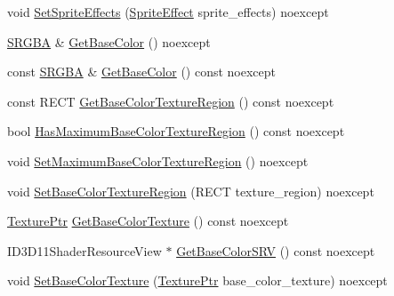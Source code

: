 \begin{DoxyCompactItemize}
\item 
void \hyperlink{classmage_1_1rendering_1_1_sprite_image_a504ebb2cdc216d26bdbcb24cfa5466d4}{Set\+Sprite\+Effects} (\hyperlink{namespacemage_1_1rendering_a4dbc3536c87b906f1d41d863ec458e78}{Sprite\+Effect} sprite\+\_\+effects) noexcept
\item 
\hyperlink{structmage_1_1_s_r_g_b_a}{S\+R\+G\+BA} \& \hyperlink{classmage_1_1rendering_1_1_sprite_image_ad3c4f224a6cf943930fc2d9222e6ec59}{Get\+Base\+Color} () noexcept
\item 
const \hyperlink{structmage_1_1_s_r_g_b_a}{S\+R\+G\+BA} \& \hyperlink{classmage_1_1rendering_1_1_sprite_image_aab9942459788c0463782b06bcd0fb6c8}{Get\+Base\+Color} () const noexcept
\item 
const R\+E\+CT \hyperlink{classmage_1_1rendering_1_1_sprite_image_ae8d120b87e4791cf85799623ae554f41}{Get\+Base\+Color\+Texture\+Region} () const noexcept
\item 
bool \hyperlink{classmage_1_1rendering_1_1_sprite_image_a89e9dd78d50c2c312e06686bcc7347c1}{Has\+Maximum\+Base\+Color\+Texture\+Region} () const noexcept
\item 
void \hyperlink{classmage_1_1rendering_1_1_sprite_image_a5b0a8abc53768cce82c3c2f8f1a96745}{Set\+Maximum\+Base\+Color\+Texture\+Region} () noexcept
\item 
void \hyperlink{classmage_1_1rendering_1_1_sprite_image_a54b349a9f73c7d6f3ded4a3d1f3172bf}{Set\+Base\+Color\+Texture\+Region} (R\+E\+CT texture\+\_\+region) noexcept
\item 
\hyperlink{namespacemage_1_1rendering_a6f3ae54f825328465b0cdde0f0de4a36}{Texture\+Ptr} \hyperlink{classmage_1_1rendering_1_1_sprite_image_ab5b257c4df82dc72223affe8b32c0b70}{Get\+Base\+Color\+Texture} () const noexcept
\item 
I\+D3\+D11\+Shader\+Resource\+View $\ast$ \hyperlink{classmage_1_1rendering_1_1_sprite_image_a7dceee8dfe1432948a77f0563d6b70a3}{Get\+Base\+Color\+S\+RV} () const noexcept
\item 
void \hyperlink{classmage_1_1rendering_1_1_sprite_image_a363b30407434dea9d3069142ff8c4059}{Set\+Base\+Color\+Texture} (\hyperlink{namespacemage_1_1rendering_a6f3ae54f825328465b0cdde0f0de4a36}{Texture\+Ptr} base\+\_\+color\+\_\+texture) noexcept
\end{DoxyCompactItemize}

